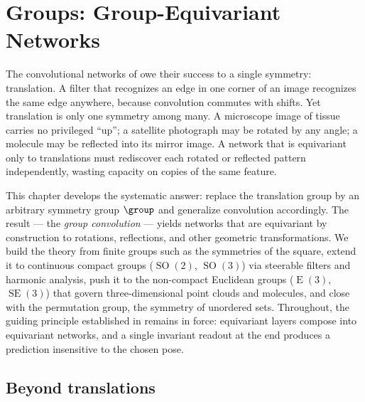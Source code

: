\providecommand{\SO}{\operatorname{SO}}
\providecommand{\OO}{\operatorname{O}}
\providecommand{\SE}{\operatorname{SE}}
\providecommand{\Eucl}{\operatorname{E}}
\providecommand{\GL}{\operatorname{GL}}
\providecommand{\Sym}{\mathfrak{S}}
\providecommand{\Haar}{\mathrm{d}\mu}
\providecommand{\softmax}{\operatorname{softmax}}
\providecommand{\Stab}{\operatorname{Stab}}
\providecommand{\Orb}{\operatorname{Orb}}
\providecommand{\Attn}{\operatorname{Attn}}
\providecommand{\MLP}{\operatorname{MLP}}
\providecommand{\diag}{\operatorname{diag}}

\chapter{Groups: Group-Equivariant Networks}
\label{ch:groups}

The convolutional networks of  owe their success to a single
symmetry: translation. A filter that recognizes an edge in one corner of an
image recognizes the same edge anywhere, because convolution commutes with
shifts. Yet translation is only one symmetry among many. A microscope image of
tissue carries no privileged ``up''; a satellite photograph may be rotated by
any angle; a molecule may be reflected into its mirror image. A network that is
equivariant only to translations must rediscover each rotated or reflected
pattern independently, wasting capacity on copies of the same feature.

This chapter develops the systematic answer: replace the translation group by an
arbitrary symmetry group $\group$ and generalize convolution accordingly. The
result --- the \emph{group convolution} --- yields networks that are
equivariant by construction to rotations, reflections, and other geometric
transformations. We build the theory from finite groups such as the symmetries
of the square, extend it to continuous compact groups ($\SO(2)$, $\SO(3)$) via
steerable filters and harmonic analysis, push it to the non-compact Euclidean
groups ($\Eucl(3)$, $\SE(3)$) that govern three-dimensional point clouds and
molecules, and close with the permutation group, the symmetry of unordered
sets. Throughout, the guiding principle established in  remains
in force: equivariant layers compose into equivariant networks, and a single
invariant readout at the end produces a prediction insensitive to the chosen
pose.

\section{Beyond translations}
\label{sec:groups:beyond}


